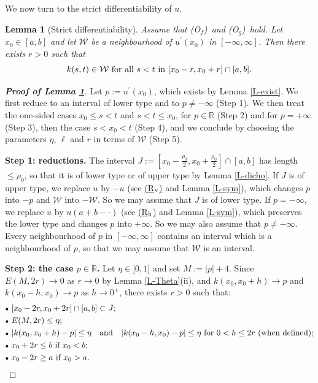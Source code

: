 \documentclass[reqno,12pt]{amsart}
\numberwithin{equation}{section}
\def\RR{{\mathds R}}
\def\Of{{\sf (O$_f$)}}
\newcommand{\Rv}{\hyperref[HypS1]{{\sf (R$_{\rm v}$)}}}
\newcommand{\Rh}{\hyperref[HypS2]{{\sf (R$_{\rm h}$)}}}
\def\Og{{\sf (O$_g$)}}
\newtheorem{lemma}[theorem]{Lemma}
\theoremstyle{remark}
\begin{document}
We now turn to the strict differentiability of $u$.

\begin{lemma}[Strict differentiability]\label{L-strict}
Assume that \Of\ and \Og\ hold. Let $x_0\in[a,b]$ and let $\mathcal{W}$ be a neighbourhood of $u^\prime(x_0)$ in $[-\infty,\infty]$. Then there exists $r>0$ such that
\begin{equation*}
k(s,t)\in\mathcal{W}\hbox{ for all }s<t\hbox{ in }[x_0-r,x_0+r]\cap[a,b].
\end{equation*}
\end{lemma}

\begin{proof}[\bf Proof of Lemma \ref{L-strict}]
Let $p:=u^\prime(x_0)$, which exists by Lemma \ref{L-exist}. We first reduce to an interval of lower type and to $p\neq-\infty$ (Step 1). We then treat the one-sided cases $x_0\leq s<t$ and $s<t\leq x_0$, for $p\in\RR$ (Step 2) and for $p=+\infty$ (Step 3), then the case $s<x_0<t$ (Step 4), and we conclude by choosing the parameters $\eta$, $\ell$ and $r$ in terms of $\mathcal{W}$ (Step 5).

\bigskip

{\bf Step 1: reductions.} The interval $J:=[x_0-\frac{\rho_0}2,x_0+\frac{\rho_0}2]\cap[a,b]$ has length $\leq\rho_0$, so that it is of lower type or of upper type by Lemma \ref{L-dicho}.
If $J$ is of upper type, we replace $u$ by $-u$ (see \Rv{} and Lemma \ref{L-sym}), which changes $p$ into $-p$ and $\mathcal{W}$ into $-\mathcal{W}$. So we may assume that $J$ is of lower type. If $p=-\infty$, we replace $u$ by $u(a+b-\cdot)$ (see \Rh{} and Lemma \ref{L-sym}), which preserves the lower type and changes $p$ into $+\infty$. So we may also assume that $p\neq-\infty$. Every neighbourhood of $p$ in $[-\infty,\infty]$ contains an interval which is a neighbourhood of $p$, so that we may assume that $\mathcal{W}$ is an interval.

\bigskip

{\bf Step 2: the case \boldmath$p\in\RR$\unboldmath.} Let $\eta\in]0,1]$ and set $M:=|p|+4$. Since $E(M,2r)\to0$ as $r\to0$ by Lemma \ref{L-Theta}(ii), and $k(x_0,x_0+h)\to p$ and $k(x_0-h,x_0)\to p$ as $h\to0^+$, there exists $r>0$ such that:
\begin{align*}
&{\scriptstyle\bullet}\ [x_0-2r,x_0+2r]\cap[a,b]\subset J;\\
&{\scriptstyle\bullet}\ E(M,2r)\leq\eta;\\
&{\scriptstyle\bullet}\ |k(x_0,x_0+h)-p|\leq\eta\quad\hbox{and}\quad|k(x_0-h,x_0)-p|\leq\eta\hbox{ for }0<h\leq2r\hbox{ (when defined)};\\
&{\scriptstyle\bullet}\ x_0+2r\leq b\hbox{ if }x_0<b;\\
&{\scriptstyle\bullet}\ x_0-2r\geq a\hbox{ if }x_0>a.
\end{align*}


\end{proof}
\end{document}
